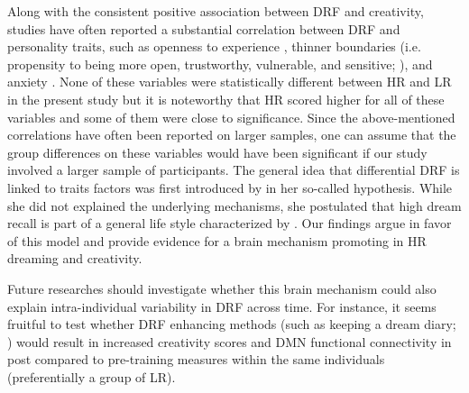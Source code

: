 Along with the consistent positive association between DRF and creativity, studies have often reported a substantial correlation between DRF and personality traits, such as openness to experience \citep{schredl_dream_2003}, thinner boundaries (i.e. propensity to being more open, trustworthy, vulnerable, and sensitive; \citealp{hartmann_boundaries_1989, schredl_dreaming_1996}), and anxiety \citep{schonbar_manifest_1959, tart_frequency_1962}. None of these variables were statistically different between HR and LR in the present study but it is noteworthy that HR scored higher for all of these variables and some of them were close to significance. Since the above-mentioned correlations have often been reported on larger samples, one can assume that the group differences on these variables would have been significant if our study involved a larger sample of participants. The general idea that differential DRF is linked to traits factors was first introduced by \citet{schonbar_differential_1965} in her so-called  hypothesis. While she did not explained the underlying mechanisms, she postulated that high dream recall is part of a general life style characterized by  \citep{schredl_dream_1999}. Our findings argue in favor of this model and provide evidence for a brain mechanism promoting in HR dreaming and creativity.

Future researches should investigate whether this brain mechanism could also explain intra-individual variability in DRF across time. For instance, it seems fruitful to test whether DRF enhancing methods (such as keeping a dream diary; \citealp{schredl_questionnaires_2002}) would result in increased creativity scores and DMN functional connectivity in post compared to pre-training measures within the same individuals (preferentially a group of LR).

%
